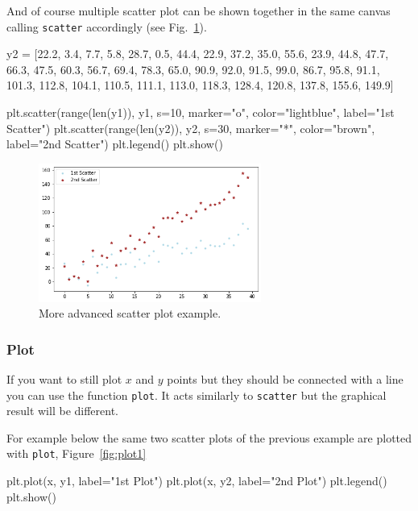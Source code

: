 \begin{ipython}
And of course multiple scatter plot can be shown together in the same
canvas calling \texttt{scatter} accordingly (see Fig.~\ref{fig:scatter2}).

\begin{ipython}
y2 = [22.2, 3.4, 7.7, 5.8, 28.7, 0.5, 44.4, 22.9, 37.2, 35.0, 55.6,
      23.9, 44.8, 47.7, 66.3, 47.5, 60.3, 56.7, 69.4, 78.3, 65.0,
      90.9, 92.0, 91.5, 99.0, 86.7, 95.8, 91.1, 101.3, 112.8,
      104.1, 110.5, 111.1, 113.0, 118.3, 128.4, 120.8, 137.8, 155.6, 149.9]

plt.scatter(range(len(y1)), y1, s=10, marker="o",
color="lightblue", label="1st Scatter")
plt.scatter(range(len(y2)), y2, s=30, marker="*",
color="brown", label="2nd Scatter")
plt.legend()
plt.show()
\end{ipython}

\begin{figure}[htb]
	\centering
	\includegraphics[width=0.65\textwidth]{figures/scatter2}
	\caption{More advanced scatter plot example.}
	\label{fig:scatter2}
\end{figure}

\subsubsection{Plot}\label{plot}

If you want to still plot \(x\) and \(y\) points but they should be
connected with a line you can use the function \texttt{plot}. It acts
similarly to \texttt{scatter} but the graphical result will be
different.

For example below the same two scatter plots of the previous example are
plotted with \texttt{plot}, Figure~\ref{fig:plot1}

\begin{ipython}
plt.plot(x, y1, label="1st Plot")
plt.plot(x, y2, label="2nd Plot")
plt.legend()
plt.show()
\end{ipython}


\end{ipython}
